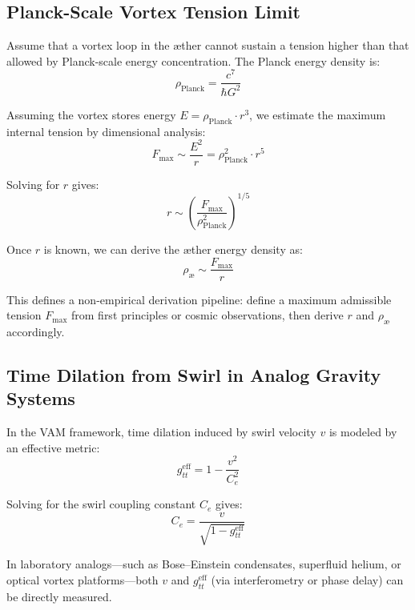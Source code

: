 \subsection{ Planck-Scale Vortex Tension Limit}

Assume that a vortex loop in the æther cannot sustain a tension higher than that allowed by Planck-scale energy concentration. The Planck energy density is:
\begin{equation}
    \rho_{\text{Planck}} = \frac{c^7}{\hbar G^2}
\end{equation}

Assuming the vortex stores energy $E = \rho_{\text{Planck}} \cdot r^3$, we estimate the maximum internal tension by dimensional analysis:
\begin{equation}
    F_{\max} \sim \frac{E^2}{r} = \rho_{\text{Planck}}^2 \cdot r^5
\end{equation}

Solving for $r$ gives:
\begin{equation}
    r \sim \left( \frac{F_{\max}}{\rho_{\text{Planck}}^2} \right)^{1/5}
\end{equation}

Once $r$ is known, we can derive the æther energy density as:
\begin{equation}
    \rho_{\text{æ}} \sim \frac{F_{\max}}{r}
\end{equation}

This defines a non-empirical derivation pipeline: define a maximum admissible tension $F_{\max}$ from first principles or cosmic observations, then derive $r$ and $\rho_{\text{æ}}$ accordingly.

\subsection{ Time Dilation from Swirl in Analog Gravity Systems}

In the VAM framework, time dilation induced by swirl velocity $v$ is modeled by an effective metric:
\begin{equation}
    g_{tt}^{\text{eff}} = 1 - \frac{v^2}{C_e^2}
\end{equation}

Solving for the swirl coupling constant $C_e$ gives:
\begin{equation}
    C_e = \frac{v}{\sqrt{1 - g_{tt}^{\text{eff}}}}
\end{equation}

In laboratory analogs—such as Bose–Einstein condensates, superfluid helium, or optical vortex platforms—both $v$ and $g_{tt}^{\text{eff}}$ (via interferometry or phase delay) can be directly measured.


